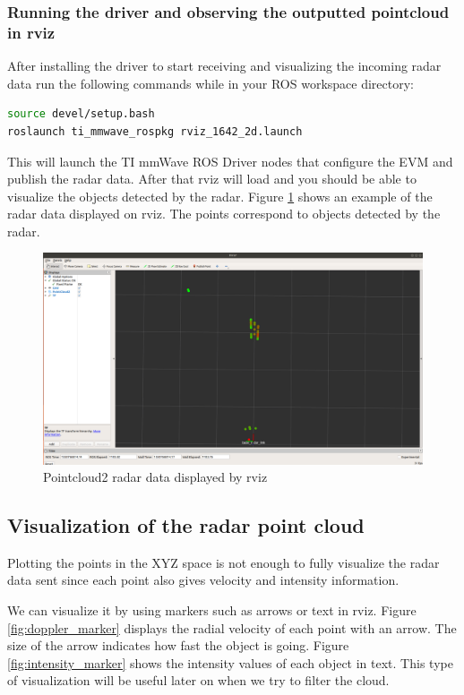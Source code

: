 \documentclass[12pt]{article}
\begin{document}
\subsubsection{Running the driver and observing the outputted pointcloud in rviz}
After installing the driver \cite{tidriver} to start receiving and visualizing the incoming radar data run the following commands while in your ROS workspace directory:
 \begin{lstlisting}[language=bash]
source devel/setup.bash
roslaunch ti_mmwave_rospkg rviz_1642_2d.launch
\end{lstlisting}

This will launch the TI mmWave ROS Driver nodes that configure the EVM and publish the radar data. After that rviz will load and you should be able to visualize the objects detected by the radar. Figure \ref{fig:radar_rviz} shows an example of the radar data displayed on rviz. The points correspond to objects   detected by the radar.

\begin{figure}[!htb]
    \centering
    \includegraphics[scale=0.2]{pc_not_filt.png}
    \caption{Pointcloud2 radar data displayed by rviz}
    \label{fig:radar_rviz}
\end{figure}
\subsection{Visualization of the radar point cloud}
Plotting the points in the XYZ space is not enough to fully visualize the radar data sent since each point also gives velocity and intensity information.

We can visualize it by using markers such as arrows or text in rviz.
Figure \ref{fig:doppler_marker} displays the radial velocity of each point with an arrow. The size of the arrow indicates how fast the object is going. Figure \ref{fig:intensity_marker} shows the intensity values of each object in text. This type of visualization will be useful later on when we try to filter the cloud.
\end{document}
